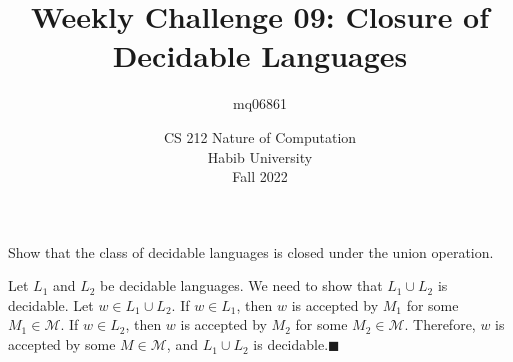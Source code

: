 \documentclass[a4paper]{exam}
\title{Weekly Challenge 09: Closure of Decidable Languages}
\author{mq06861} %
\date{CS 212 Nature of Computation\\Habib University\\Fall 2022}
\begin{document}
\maketitle

\begin{questions}
  

	Show that the class of decidable languages is closed under the union operation.
  
	\begin{solution}
		Let $L_1$ and $L_2$ be decidable languages. We need to show that $L_1 \cup L_2$ is decidable. Let $w \in L_1 \cup L_2$. If $w \in L_1$, then $w$ is accepted by $M_1$ for some $M_1 \in \mathcal{M}$. If $w \in L_2$, then $w$ is accepted by $M_2$ for some $M_2 \in \mathcal{M}$. Therefore, $w$ is accepted by some $M \in \mathcal{M}$, and $L_1 \cup L_2$ is decidable.\hfill\(\blacksquare\)
	\end{solution}
\end{questions}
\end{document}

